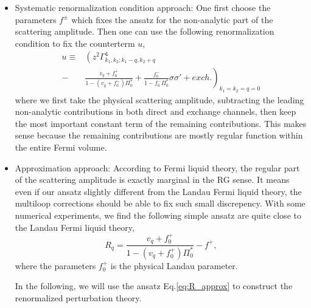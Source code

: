 \documentclass[reprint,amsmath,amssymb,aps,prb]{revtex4-1}
\begin{document}
\begin{itemize}
    \item Systematic renormalization condition approach: One first choose the parameters $f^{\pm}$ which fixes the ansatz for the non-analytic part of the scattering amplitude. Then one can use the following renormalization condition to fix the counterterm $u$,
          \begin{align*}
              u \equiv & \left( z^2\Gamma^4_{k_1, k_2; k_1-q, k_2+q} \right.                                                                 \\
              -        & \left.\frac{v_q+f_0^+}{1-(v_q+f_0^+)\Pi^*_0}+\frac{f_0^-}{1-f_0^-\Pi_0^*}\sigma\sigma' + exch.\right)_{k_1=k_2=q=0}
          \end{align*}
          where we first take the physical scattering amplitude, subtracting the leading non-analytic contributions in both direct and exchange channels, then keep the most important constant term of the remaining contributions. This makes sense because the remaining contributions are mostly regular function within the entire Fermi volume.
    \item Approximation approach: According to Fermi liquid theory, the regular part of the scattering amplitude is exactly marginal in the RG sense. It means even if our ansatz slightly different from the Landau Fermi liquid theory, the multiloop corrections should be able to fix such small discrepency. With some numerical experiments, we find the following simple ansatz are quite close to the Landau Fermi liquid theory,
          \begin{equation}
              \label{eq:R_approx}
              R_q = \frac{v_q+f_0^+}{1-(v_q+f_0^+)\Pi^*_0}-f^+,
          \end{equation}
          where the parameters $f_0^+$ is the physical Landau parameter.

          In the following, we will use the ansatz Eq.\eqref{eq:R_approx} to construct the renormalized perturbation theory.
\end{itemize}

\end{document}
